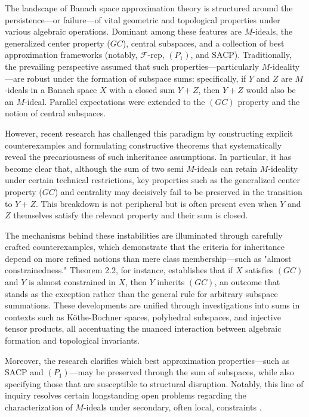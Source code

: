 \documentclass[11pt]{article}
\begin{document}
The landscape of Banach space approximation theory is structured around the persistence—or failure—of vital geometric and topological properties under various algebraic operations. Dominant among these features are $M$-ideals, the generalized center property ($GC$), central subspaces, and a collection of best approximation frameworks (notably, $\mathscr{F}$-rcp, $(P_1)$, and SACP). Traditionally, the prevailing perspective assumed that such properties—particularly $M$-ideality—are robust under the formation of subspace sums: specifically, if $Y$ and $Z$ are $M$-ideals in a Banach space $X$ with a closed sum $Y + Z$, then $Y + Z$ would also be an $M$-ideal. Parallel expectations were extended to the $(GC)$ property and the notion of central subspaces.

However, recent research has challenged this paradigm by constructing explicit counterexamples and formulating constructive theorems that systematically reveal the precariousness of such inheritance assumptions. In particular, it has become clear that, although the sum of two semi $M$-ideals can retain $M$-ideality under certain technical restrictions, key properties such as the generalized center property ($GC$) and centrality may decisively fail to be preserved in the transition to $Y + Z$. This breakdown is not peripheral but is often present even when $Y$ and $Z$ themselves satisfy the relevant property and their sum is closed.

The mechanisms behind these instabilities are illuminated through carefully crafted counterexamples, which demonstrate that the criteria for inheritance depend on more refined notions than mere class membership—such as "almost constrainedness." Theorem 2.2, for instance, establishes that if $X$ satisfies $(GC)$ and $Y$ is almost constrained in $X$, then $Y$ inherits $(GC)$, an outcome that stands as the exception rather than the general rule for arbitrary subspace summations. These developments are unified through investigations into sums in contexts such as Köthe-Bochner spaces, polyhedral subspaces, and injective tensor products, all accentuating the nuanced interaction between algebraic formation and topological invariants.

Moreover, the research clarifies which best approximation properties—such as SACP and $(P_1)$—may be preserved through the sum of subspaces, while also specifying those that are susceptible to structural disruption. Notably, this line of inquiry resolves certain longstanding open problems regarding the characterization of $M$-ideals under secondary, often local, constraints \cite{ref103}.
\end{document}
